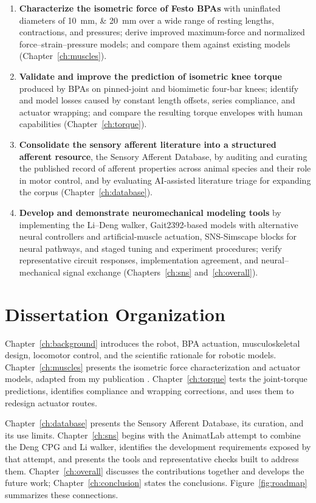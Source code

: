\begin{enumerate}
    \item \textbf{Characterize the isometric force of Festo BPAs} with uninflated diameters of \qtylist{10;20}{\mm} over a wide range of resting lengths, contractions, and pressures; derive improved maximum-force and normalized force--strain--pressure models; and compare them against existing models (Chapter~\ref{ch:muscles}).
    \item \textbf{Validate and improve the prediction of isometric knee torque} produced by BPAs on pinned-joint and biomimetic four-bar knees; identify and model losses caused by constant length offsets, series compliance, and actuator wrapping; and compare the resulting torque envelopes with human capabilities (Chapter~\ref{ch:torque}).
    \item \textbf{Consolidate the sensory afferent literature into a structured afferent resource}, the Sensory Afferent Database, by auditing and curating the published record of afferent properties across animal species and their role in motor control, and by evaluating AI-assisted literature triage for expanding the corpus (Chapter~\ref{ch:database}).
\item \textbf{Develop and demonstrate neuromechanical modeling tools} by implementing the Li--Deng walker, Gait2392-based models with alternative neural controllers and artificial-muscle actuation, SNS-Simscape blocks for neural pathways, and staged tuning and experiment procedures; verify representative circuit responses, implementation agreement, and neural--mechanical signal exchange (Chapters~\ref{ch:sns} and~\ref{ch:overall}).
\end{enumerate}

\section{Dissertation Organization}\label{sec:organization}

Chapter~\ref{ch:background} introduces the robot, BPA actuation, musculoskeletal design, locomotor control, and the scientific rationale for robotic models. Chapter~\ref{ch:muscles} presents the isometric force characterization and actuator models, adapted from my publication \citep{bolen_2026}. Chapter~\ref{ch:torque} tests the joint-torque predictions, identifies compliance and wrapping corrections, and uses them to redesign actuator routes.

Chapter~\ref{ch:database} presents the Sensory Afferent Database, its curation, and its use limits. Chapter~\ref{ch:sns} begins with the AnimatLab attempt to combine the Deng CPG and Li walker, identifies the development requirements exposed by that attempt, and presents the tools and representative checks built to address them. Chapter~\ref{ch:overall} discusses the contributions together and develops the future work; Chapter~\ref{ch:conclusion} states the conclusions. Figure~\ref{fig:roadmap} summarizes these connections.

